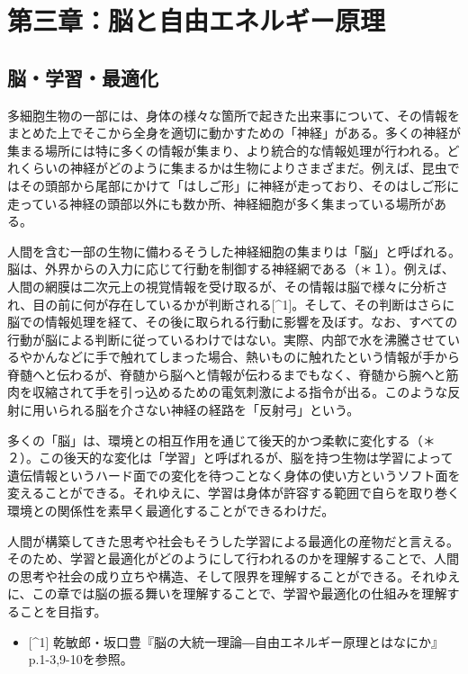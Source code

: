 \section{第三章：脳と自由エネルギー原理}\label{ux7b2cux4e09ux7ae0ux8133ux3068ux81eaux7531ux30a8ux30cdux30ebux30aeux30fcux539fux7406}

\subsection{脳・学習・最適化}\label{ux8133ux5b66ux7fd2ux6700ux9069ux5316}

多細胞生物の一部には、身体の様々な箇所で起きた出来事について、その情報をまとめた上でそこから全身を適切に動かすための「神経」がある。多くの神経が集まる場所には特に多くの情報が集まり、より統合的な情報処理が行われる。どれくらいの神経がどのように集まるかは生物によりさまざまだ。例えば、昆虫ではその頭部から尾部にかけて「はしご形」に神経が走っており、そのはしご形に走っている神経の頭部以外にも数か所、神経細胞が多く集まっている場所がある。

人間を含む一部の生物に備わるそうした神経細胞の集まりは「脳」と呼ばれる。脳は、外界からの入力に応じて行動を制御する神経網である（＊１）。例えば、人間の網膜は二次元上の視覚情報を受け取るが、その情報は脳で様々に分析され、目の前に何が存在しているかが判断される{[}\^{}1{]}。そして、その判断はさらに脳での情報処理を経て、その後に取られる行動に影響を及ぼす。なお、すべての行動が脳による判断に従っているわけではない。実際、内部で水を沸騰させているやかんなどに手で触れてしまった場合、熱いものに触れたという情報が手から脊髄へと伝わるが、脊髄から脳へと情報が伝わるまでもなく、脊髄から腕へと筋肉を収縮されて手を引っ込めるための電気刺激による指令が出る。このような反射に用いられる脳を介さない神経の経路を「反射弓」という。

多くの「脳」は、環境との相互作用を通じて後天的かつ柔軟に変化する（＊２）。この後天的な変化は「学習」と呼ばれるが、脳を持つ生物は学習によって遺伝情報というハード面での変化を待つことなく身体の使い方というソフト面を変えることができる。それゆえに、学習は身体が許容する範囲で自らを取り巻く環境との関係性を素早く最適化することができるわけだ。

人間が構築してきた思考や社会もそうした学習による最適化の産物だと言える。そのため、学習と最適化がどのようにして行われるのかを理解することで、人間の思考や社会の成り立ちや構造、そして限界を理解することができる。それゆえに、この章では脳の振る舞いを理解することで、学習や最適化の仕組みを理解することを目指す。

\begin{itemize}
\tightlist
\item
  {[}\^{}1{]}
  乾敏郎・坂口豊『脳の大統一理論―自由エネルギー原理とはなにか』p.1-3,9-10を参照。
\end{itemize}

